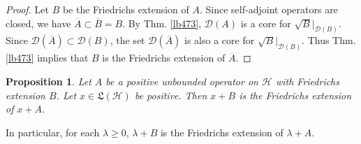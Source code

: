 \documentclass[12pt,b5paper,notitlepage]{article}
\theoremstyle{definition}
\theoremstyle{plain}
\newtheorem{pp}[df]{Proposition}
\newcommand{\fk}{\mathfrak}
\newcommand{\ovl}{\overline}
\newcommand{\Dom}{\mathscr{D}}
\newcommand{\bk}[1]{\langle {#1}\rangle}
\newcommand{\MH}{\mathcal H}
\numberwithin{equation}{section}
\begin{document}
\begin{proof}
Let $B$ be the Friedrichs extension of $A$. Since self-adjoint operators are closed, we have $\ovl A\subset\ovl B=B$. By Thm. \ref{lb473}, $\Dom(A)$ is a core for $\sqrt B|_{\Dom(B)}$. Since $\Dom(\ovl A)\subset\Dom(B)$, the set $\Dom(\ovl A)$ is also a core for $\sqrt B|_{\Dom(B)}$. Thus Thm. \ref{lb473} implies that $B$ is the Friedrichs extension of $\ovl A$.
\end{proof}

\begin{comment}
Let $B$ be the Friedrichs extension of $A$. Since self-adjoint operators are closed, we have $\ovl A\subset\ovl B=B$. By Thm. \ref{lb473}, $\Dom(A)$ is a core for $\sqrt B$. Once we prove that $\Dom(\ovl A)\subset\Dom(\sqrt B)$, then $\Dom(\ovl A)$ is also a core for $\sqrt B$. It follows from Thm. \ref{lb473} that $B$ is the Friedrich extension of $A$.

Let us prove $\Dom(\ovl A)\subset\Dom(\sqrt B)$. Choose any $\xi\in\Dom(\ovl A)$. By \eqref{eq245}, there exists a sequence $(\xi_n)$ in $\Dom(A)$ converging to $\xi$ such that $(A\xi_n)$ is a Cauchy sequence. Note that $\xi_n\in\Dom(\sqrt B)$, because $B=\sqrt B\cdot\sqrt B$ and $\xi_n\in\Dom(A)\subset\Dom(B)$. Therefore, since
\begin{align*}
\bk{\sqrt B(\xi_n-\xi_m)|\sqrt B(\xi_n-\xi_m)}=\bk{\xi_n-\xi_m|B(\xi_n-\xi_m)}=\bk{\xi_n-\xi_m|A(\xi_n-\xi_m)}
\end{align*}
converges to $0$ as $m,n\rightarrow\infty$, the sequence $(\sqrt B\xi_n)$ is Cauchy, and hence converges. Since $\sqrt B$ is closed (because $\sqrt B$ is self-adjoint) and $\xi=\lim_n\xi_n$, we conclude that $\xi\in\Dom(\sqrt B)$.
\end{comment}



\begin{pp}\label{lb479}
Let $A$ be a positive unbounded operator on $\MH$ with Friedrichs extension $B$. Let $x\in\fk L(\MH)$ be positive. Then $x+B$ is the Friedrichs extension of $x+A$.
\end{pp}

In particular, for each $\lambda\geq0$, $\lambda+B$ is the Friedrichs extension of $\lambda+A$.
\end{document}
